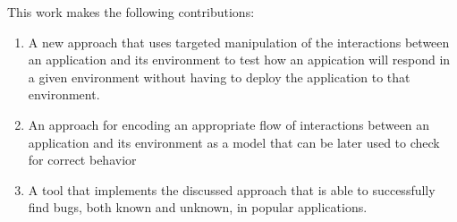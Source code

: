 This work makes the following contributions:

    \begin{enumerate}
        \item{A new approach that uses targeted manipulation of the interactions between an application and its
            environment to test how an appication will respond in a given environment without having to deploy
            the application to that environment.}
        \item{An approach for encoding an appropriate flow of interactions between an application and its environment as
            a model that can be later used to check for correct behavior}
        \item{A tool that implements the discussed approach that is able to successfully find bugs, both known and
            unknown, in popular applications.}
    \end{enumerate}


